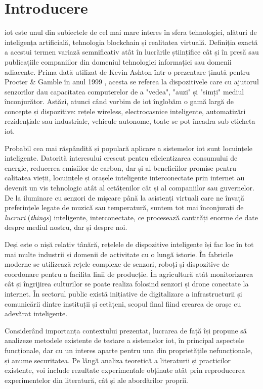 \chapter{Introducere}

\acrlong{iot} este unul din subiectele de cel mai mare interes în sfera tehnologiei,
alături de inteligența artificială, tehnologia blockchain și realitatea virtuală. 
Definiția exactă a acestui termen variază semnificativ atât în lucrările
științifice cât și în presă sau publicațiile companiilor din domeniul tehnologiei informației sau domenii adiacente. Prima dată utilizat de Kevin Ashton într-o prezentare ținută pentru Procter \& Gamble în anul 1999 \cite{ashton_2009}, acesta se referea la dispozitivele care cu ajutorul senzorilor dau capacitatea computerelor de a "vedea", "auzi" și "simți" mediul înconjurător. Astăzi, atunci când vorbim de \acrshort{iot} înglobăm o gamă largă de concepte și dispozitive: rețele wireless, electrocasnice inteligente, automatizări rezidențiale sau industriale, vehicule autonome, toate se pot încadra sub eticheta \acrshort{iot}.

Probabil cea mai răspândită și populară aplicare a sistemelor \acrshort{iot} sunt locuințele inteligente. Datorită interesului crescut pentru eficientizarea consumului de energie, reducerea emisiilor de carbon, dar și al beneficiilor promise pentru calitatea vieții, locuințele și orașele inteligente interconectate prin internet au devenit un vis tehnologic atât al cetățenilor cât și al companiilor sau guvernelor. De la iluminare cu senzori de mișcare până la asistenți virtuali care ne învață preferințele legate de muzică sau temperatură, suntem tot mai înconjurați de \textit{lucruri} (\textit{things}) inteligente, interconectate, ce procesează cantități enorme de date despre mediul nostru, dar și despre noi. 

Deși este o nișă relativ tânără, rețelele de dispozitive inteligente își fac loc în tot mai multe industrii și domenii de activitate cu o lungă istorie. În fabricile moderne se utilizează rețele complexe de senzori, roboți și dispozitive de coordonare pentru a facilita linii de producție. În agricultură atât monitorizarea cât și îngrijirea culturilor se poate realiza folosind senzori și drone conectate la internet. În sectorul public există inițiative de digitalizare a infrastructurii și comunicării dintre instituții și cetățeni, scopul final fiind crearea de orașe cu adevărat inteligente. 

Considerând importanța contextului prezentat, lucrarea de față își propune să analizeze metodele existente de testare a sistemelor \acrshort{iot}, în principal aspectele funcționale, dar cu un interes aparte pentru una din proprietățile nefuncționale, și anume securitatea. Pe lângă analiza teoretică a literaturii și practicilor existente, voi include rezultate experimentale obținute atât prin reproducerea experimentelor din literatură, cât și ale abordărilor proprii.

